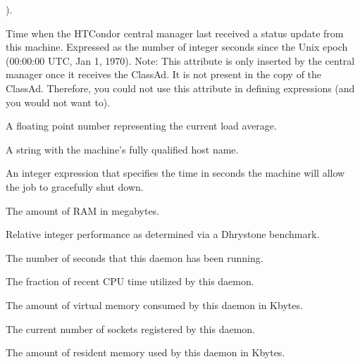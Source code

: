 \begin{description}
).
%
\item[\AdAttr{LastHeardFrom}:] Time when the HTCondor central manager last
received a status update from this machine.  
Expressed as 
the number of integer seconds since the Unix epoch (00:00:00 UTC, Jan 1, 1970).
Note: This attribute is only inserted by the central manager once it
receives the ClassAd.
It is not present in the  copy of the ClassAd.
Therefore, you could not use this attribute in defining 
expressions (and you would not want to).
%
\item[\AdAttr{LoadAvg}:] A floating point number representing the 
current load average.
%
\item[\AdAttr{Machine}:] A string with the machine's fully qualified host name.
%
\item[\AdAttr{MachineMaxVacateTime}:] An integer expression that specifies
the time in seconds the machine will allow the job to gracefully shut
down.
%
\item[\AdAttr{Memory}:] The amount of RAM in megabytes.
%
\item[\AdAttr{Mips}:] Relative integer performance as determined via a Dhrystone
benchmark.

\item[\AdAttr{MonitorSelfAge}:] The number of seconds that this daemon
  has been running.

\item[\AdAttr{MonitorSelfCPUUsage}:] The fraction of recent CPU time utilized
  by this daemon. 

\item[\AdAttr{MonitorSelfImageSize}:] The amount of virtual memory consumed by
  this daemon in Kbytes.

\item[\AdAttr{MonitorSelfRegisteredSocketCount}:] The current number of sockets
  registered by this daemon.

\item[\AdAttr{MonitorSelfResidentSetSize}:] The amount of resident memory
  used by this daemon in Kbytes.


\end{description}
